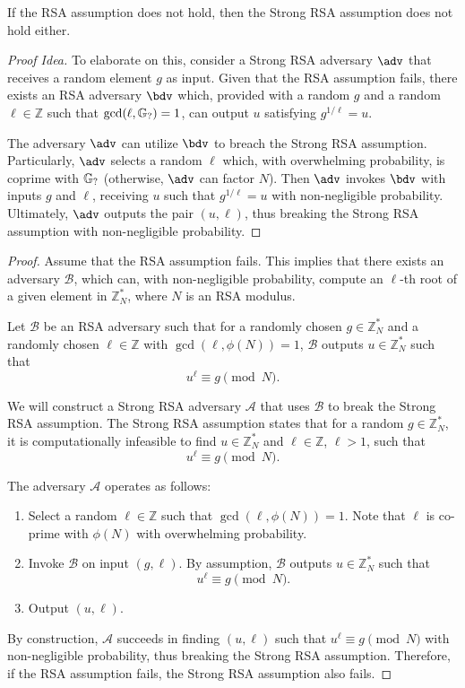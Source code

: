 \documentclass{iacrcc}
\begin{document}
\begin{claim}
If the RSA assumption does not hold, then the Strong RSA assumption does not hold either.
\end{claim}

\begin{proof}[Proof Idea]
To elaborate on this, consider a Strong RSA adversary \(\adv\) that receives a random element \(g\) as input. Given that the RSA assumption fails, there exists an RSA adversary \(\bdv\) which, provided with a random \(g\) and a random \(\ell \in \mathbb{Z}\) such that \(\gcd(\ell, \mathbb{G}_{?}) = 1\), can output \(u\) satisfying \(g^{1/\ell} = u\).

The adversary \(\adv\) can utilize \(\bdv\) to breach the Strong RSA assumption. Particularly, \(\adv\) selects a random \(\ell\) which, with overwhelming probability, is coprime with \(\mathbb{G}_{?}\) (otherwise, \(\adv\) can factor \(N\)). Then \(\adv\) invokes \(\bdv\) with inputs \(g\) and \(\ell\), receiving \(u\) such that \(g^{1/\ell} = u\) with non-negligible probability. Ultimately, \(\adv\) outputs the pair \((u, \ell)\), thus breaking the Strong RSA assumption with non-negligible probability.
\end{proof}


\begin{proof}
Assume that the RSA assumption fails. This implies that there exists an adversary $\mathcal{B}$, which can, with non-negligible probability, compute an $\ell$-th root of a given element in $\mathbb{Z}_N^*$, where $N$ is an RSA modulus.

Let $\mathcal{B}$ be an RSA adversary such that for a randomly chosen $g \in \mathbb{Z}_N^*$ and a randomly chosen $\ell \in \mathbb{Z}$ with $\gcd(\ell, \phi(N)) = 1$, $\mathcal{B}$ outputs $u \in \mathbb{Z}_N^*$ such that
\[
u^\ell \equiv g \pmod{N}.
\]

We will construct a Strong RSA adversary $\mathcal{A}$ that uses $\mathcal{B}$ to break the Strong RSA assumption. The Strong RSA assumption states that for a random $g \in \mathbb{Z}_N^*$, it is computationally infeasible to find $u \in \mathbb{Z}_N^*$ and $\ell \in \mathbb{Z}$, $\ell > 1$, such that
\[
u^\ell \equiv g \pmod{N}.
\]

The adversary $\mathcal{A}$ operates as follows:
\begin{enumerate}
\item Select a random $\ell \in \mathbb{Z}$ such that $\gcd(\ell, \phi(N)) = 1$. Note that $\ell$ is co-prime with $\phi(N)$ with overwhelming probability.
\item Invoke $\mathcal{B}$ on input $(g, \ell)$. By assumption, $\mathcal{B}$ outputs $u \in \mathbb{Z}_N^*$ such that
\[
u^\ell \equiv g \pmod{N}.
\]
\item Output $(u, \ell)$.
\end{enumerate}

By construction, $\mathcal{A}$ succeeds in finding $(u, \ell)$ such that $u^\ell \equiv g \pmod{N}$ with non-negligible probability, thus breaking the Strong RSA assumption. Therefore, if the RSA assumption fails, the Strong RSA assumption also fails.
\end{proof}
\end{document}
